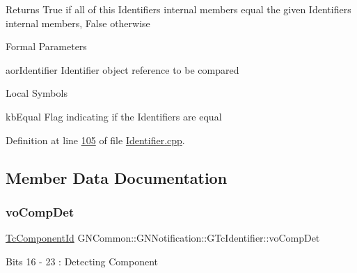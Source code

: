 \begin{DoxyReturn}{Returns}
True if all of this Identifier\textquotesingle{}s internal members equal the given Identifier\textquotesingle{}s internal members, False otherwise
\end{DoxyReturn}
\begin{DoxyParagraph}{Formal Parameters}

\begin{DoxyPre}{\ttfamily [ in ]  aorIdentifier    Identifier object reference to be compared }\end{DoxyPre}

\end{DoxyParagraph}
\begin{DoxyParagraph}{Local Symbols}

\begin{DoxyPre}{\ttfamily  kbEqual    Flag indicating if the Identifiers are equal }\end{DoxyPre}
 
\end{DoxyParagraph}


Definition at line \mbox{\hyperlink{_identifier_8cpp_source_l00105}{105}} of file \mbox{\hyperlink{_identifier_8cpp_source}{Identifier.\+cpp}}.



\subsection{Member Data Documentation}
\mbox{\label{class_g_n_common_1_1_g_n_notification_1_1_g_tc_identifier_a16951736dd13c129f4a7632285476625}} 
\subsubsection{\texorpdfstring{vo\+Comp\+Det}{voCompDet}}
{\footnotesize\ttfamily \mbox{\hyperlink{namespace_g_n_common_1_1_g_n_notification_a24173724db4e769e5cf4bc03c70c34cd}{Tc\+Component\+Id}} G\+N\+Common\+::\+G\+N\+Notification\+::\+G\+Tc\+Identifier\+::vo\+Comp\+Det}

Bits 16 -\/ 23 \+: Detecting Component 

